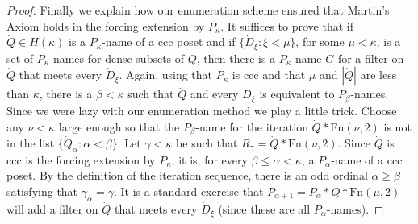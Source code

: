 \documentclass{amsart}
\theoremstyle{definition}
\theoremstyle{remark}
\begin{document}
\begin{proof}
       Finally we explain how our enumeration scheme ensured
       that Martin's Axiom holds in the forcing extension by $P_\kappa$.
    It suffices to prove that if $\dot Q\in H(\kappa)$ is a $P_\kappa$-name
    of a ccc poset and if  $\{\dot  D_\xi : \xi <\mu\}$, for some $\mu<\kappa$,
    is a set of $P_\kappa$-names for dense subsets of $\dot Q$,
    then there is a $P_\kappa$-name $\tilde G$ for a filter
    on $\dot Q$ that meets every $\dot D_\xi$. 
    Again, using that $P_\kappa$ is ccc and that $\mu$ and $|\dot Q|$
    are less than $\kappa$, there is a $\beta < \kappa$
    such that $\dot Q$ and every $\dot D_\xi$ is equivalent
    to $P_\beta$-names. Since we were lazy with our enumeration
    method we play a little trick. Choose any $\nu<\kappa$
    large enough so that the $P_\beta$-name for
    the iteration $\dot Q* \mbox{Fn}(\nu,2)$ is not
    in the list $\{ \dot Q_\alpha : \alpha < \beta\}$. 
    Let $\gamma<\kappa$ be such that $R_\gamma = \dot Q*\mbox{Fn}(\nu,2)$.
    Since $\dot Q$ is   ccc is the forcing extension by $P_\kappa$,
     it is, for every $\beta \leq \alpha < \kappa$, a $P_\alpha$-name
     of a ccc poset.
    By the definition of the iteration sequence,
     there is an odd ordinal $\alpha \geq  \beta$ satisfying 
     that $\gamma_\alpha =\gamma$.  It is a standard exercise
     that $P_{\alpha+1} = P_\alpha * \dot Q * \mbox{Fn}(\mu,2)$
     will add a filter on $\dot Q$ that meets
     every $\dot D_\xi$ (since these are all $P_\alpha$-names).
   \end{proof}

   \egroup
   
\end{document}
